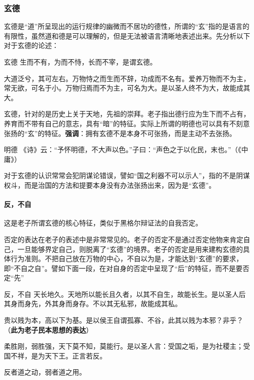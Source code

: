 \subsubsection{玄德}

玄德是“道”所呈现出的运行规律的幽微而不居功的德性，所谓的“玄”指的是语言的有限性，虽然道和德是可以理解的，但是无法被语言清晰地表述出来。先分析以下对于玄德的论述：

\begin{fancybox}{玄德}
    生而不有，为而不恃，长而不宰，是谓玄德。
    
    大道泛兮，其可左右。万物恃之而生而不辞，功成而不名有。爱养万物而不为主，常无欲，可名于小。万物归焉而不为主，可名为大。是以圣人终不为大，故能成其大。
\end{fancybox}

玄德，针对的是历史上关于天地，先祖的崇拜。老子指出德行应为生下而不占有，养育而不带有自己的意志，具有“暗”的特征。实际上所谓的明德也可以具有不刻意张扬的“玄”的特征。\textbf{强调}：拥有玄德不是本身不可张扬，而是主动不去张扬。

\begin{fancybox}{明德}
    《诗》云：“予怀明德，不大声以色。”子曰：“声色之于以化民，末也。”（《中庸》）
\end{fancybox}

对于玄德的认识常常会犯阴谋论错误，譬如“国之利器不可以示人”，指的不是阴谋权斗，而是治国的方法和提要本身没有办法张扬出来，因为是“玄德”。

\paragraph{反，不自}
这是老子所谓玄德的核心特征，类似于黑格尔辩证法的自我否定。

否定的表达在老子的表述中是非常常见的。老子的否定不是通过否定他物来肯定自己，一旦能够界定自己，则脱离了“玄德”的境界。老子的否定是用来建构玄德的具体行为准则。不把自己放在万物的中心，不自以为是，才能达到“玄德”的要求，即“不自之自”。譬如下面一段，在对自身的否定中呈现了“后”的特征，而不是要否定“先”

\begin{fancybox}{反，不自}
    天长地久。天地所以能长且久者，以其不自生，故能长生。是以圣人后其身而身先，外其身而身存。不以其无私邪，故能成其私。

    贵以贱为本，高以下为基。是以侯王自谓孤寡、不谷，此其以贱为本邪？非乎？（\textbf{此为老子民本思想的表达}）

    柔胜刚，弱胜强，天下莫不知，莫能行。是以圣人言：受国之垢，是为社稷主；受国不祥，是为天下王。正言若反。

    反者道之动，弱者道之用。
\end{fancybox}

